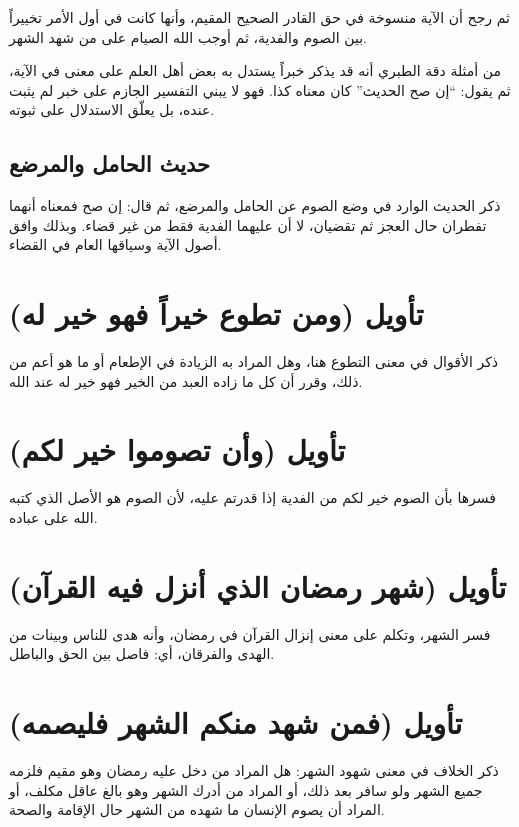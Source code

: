 ثم رجح  أن الآية منسوخة في حق القادر الصحيح المقيم، وأنها كانت في أول الأمر تخييراً بين الصوم والفدية، ثم أوجب الله الصيام على من شهد الشهر.

\begin{fawaid}
من أمثلة دقة الطبري أنه قد يذكر خبراً يستدل به بعض أهل العلم على معنى في الآية، ثم يقول: ``إن صح الحديث'' كان معناه كذا. فهو لا يبني التفسير الجازم على خبر لم يثبت عنده، بل يعلّق الاستدلال على ثبوته.
\end{fawaid}

\subsection{حديث الحامل والمرضع}
ذكر  الحديث الوارد في وضع الصوم عن الحامل والمرضع، ثم قال: إن صح فمعناه أنهما تفطران حال العجز ثم تقضيان، لا أن عليهما الفدية فقط من غير قضاء. وبذلك وافق أصول الآية وسياقها العام في القضاء.

\separator

\section{تأويل (ومن تطوع خيراً فهو خير له)}
ذكر  الأقوال في معنى التطوع هنا، وهل المراد به الزيادة في الإطعام أو ما هو أعم من ذلك، وقرر أن كل ما زاده العبد من الخير فهو خير له عند الله.

\section{تأويل (وأن تصوموا خير لكم)}
فسرها  بأن الصوم خير لكم من الفدية إذا قدرتم عليه، لأن الصوم هو الأصل الذي كتبه الله على عباده.

\separator

\section{تأويل (شهر رمضان الذي أنزل فيه القرآن)}
فسر  الشهر، وتكلم على معنى إنزال القرآن في رمضان، وأنه هدى للناس وبينات من الهدى والفرقان، أي: فاصل بين الحق والباطل.

\section{تأويل (فمن شهد منكم الشهر فليصمه)}
ذكر  الخلاف في معنى شهود الشهر: هل المراد من دخل عليه رمضان وهو مقيم فلزمه جميع الشهر ولو سافر بعد ذلك، أو المراد من أدرك الشهر وهو بالغ عاقل مكلف، أو المراد أن يصوم الإنسان ما شهده من الشهر حال الإقامة والصحة.

